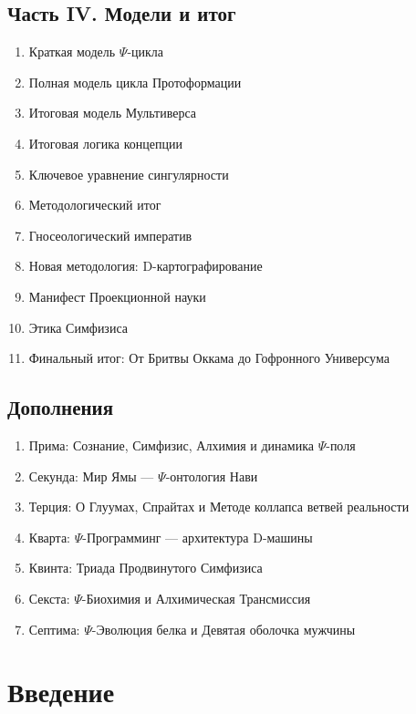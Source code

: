 \documentclass[a4paper,12pt]{article}
\begin{document}
\subsection*{Часть IV. Модели и итог}
\begin{enumerate}[label=4.\arabic*.]
	\item Краткая модель $\Psi$-цикла
	\item Полная модель цикла Протоформации
	\item Итоговая модель Мультиверса
	\item Итоговая логика концепции
	\item Ключевое уравнение сингулярности
	\item Методологический итог
	\item Гносеологический императив
	\item Новая методология: D-картографирование
	\item Манифест Проекционной науки
	\item Этика Симфизиса
	\item Финальный итог: От Бритвы Оккама до Гофронного Универсума
\end{enumerate}

\subsection*{Дополнения}
\begin{enumerate}[label=Д.\arabic*.]
	\item Прима: Сознание, Симфизис, Алхимия и динамика $\Psi$-поля
	\item Секунда: Мир Ямы — $\Psi$-онтология Нави
	\item Терция: О Глуумах, Спрайтах и Методе коллапса ветвей реальности
	\item Кварта: $\Psi$-Программинг — архитектура D-машины
	\item Квинта: Триада Продвинутого Симфизиса
	\item Секста: $\Psi$-Биохимия и Алхимическая Трансмиссия
	\item Септима: $\Psi$-Эволюция белка и Девятая оболочка мужчины
\end{enumerate}

\newpage

\section*{Введение}
\end{document}
